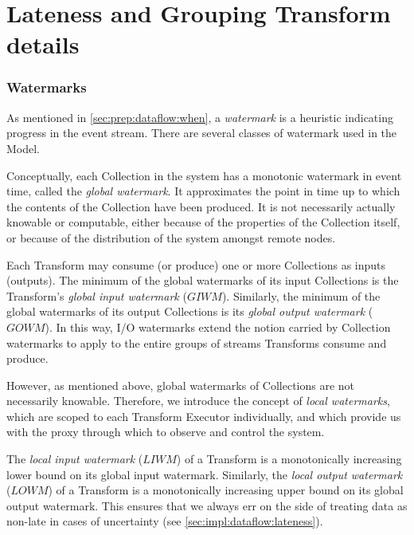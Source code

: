 
\chapter{Lateness and Grouping Transform details}\label{apx:lateness}

\subsection{Watermarks}\label{sec:impl:dataflow:watermarks}


As mentioned in \cref{sec:prep:dataflow:when}, a \emph{watermark} is a heuristic indicating progress in the event stream.
There are several classes of watermark used in the Model.

Conceptually, each Collection in the system has a monotonic watermark in event time, called the \emph{global watermark}.
It approximates the point in time up to which the contents of the Collection have been produced.
It is not necessarily actually knowable or computable, either because of the properties of the Collection itself, or because of the distribution of the system amongst remote nodes.

Each Transform may consume (or produce) one or more Collections as inputs (outputs).
The minimum of the global watermarks of its input Collections is the Transform's \emph{global input watermark} ($\mathit{GIWM}$).
Similarly, the minimum of the global watermarks of its output Collections is its \emph{global output watermark} ($\mathit{GOWM}$).
In this way, I/O watermarks extend the notion carried by Collection watermarks to apply to the entire groups of streams Transforms consume and produce.

However, as mentioned above, global watermarks of Collections are not necessarily knowable.
Therefore, we introduce the concept of \emph{local watermarks}, which are scoped to each Transform Executor individually, and which provide us with the proxy through which to observe and control the system.

The \emph{local input watermark} ($\mathit{LIWM}$) of a Transform is a monotonically increasing lower bound on its global input watermark.
Similarly, the \emph{local output watermark} ($\mathit{LOWM}$) of a Transform is a monotonically increasing upper bound on its global output watermark.
This ensures that we always err on the side of treating data as non-late in cases of uncertainty (see \cref{sec:impl:dataflow:lateness}).

